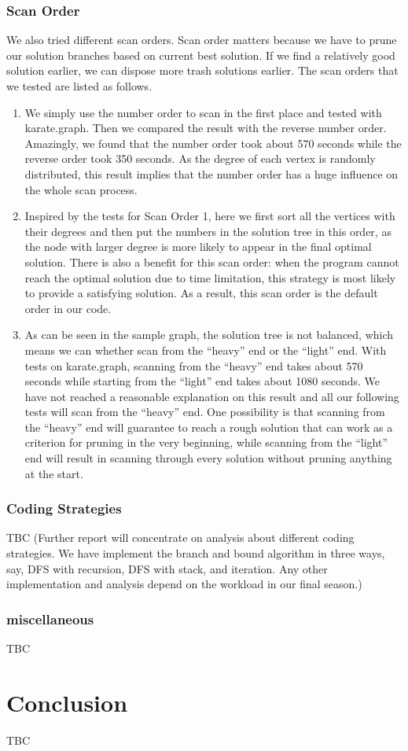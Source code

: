 \subsubsection{Scan Order}
We also tried different scan orders. Scan order matters because we have to prune our solution branches based on current best solution. If we find a relatively good solution earlier, we can dispose more trash solutions earlier. The scan orders that we tested are listed as follows.
\begin{enumerate}
\item We simply use the number order to scan in the first place and tested with karate.graph. Then we compared the result with the reverse number order. Amazingly, we found that the number order took about 570 seconds while the reverse order took 350 seconds. As the degree of each vertex is randomly distributed, this result implies that the number order has a huge influence on the whole scan process.
\item Inspired by the tests for Scan Order 1, here we first sort all the vertices with their degrees and then put the numbers in the solution tree in this order, as the node with larger degree is more likely to appear in the final optimal solution. There is also a benefit for this scan order: when the program cannot reach the optimal solution due to time limitation, this strategy is most likely to provide a satisfying solution. As a result, this scan order is the default order in our code.
\item As can be seen in the sample graph, the solution tree is not balanced, which means we can whether scan from the ``heavy'' end or the ``light'' end. With tests on karate.graph, scanning from the ``heavy'' end takes about 570 seconds while starting from the ``light'' end takes about 1080 seconds. We have not reached a reasonable explanation on this result and all our following tests will scan from the ``heavy'' end. One possibility is that scanning from the ``heavy'' end will guarantee to reach a rough solution that can work as a criterion for pruning in the very beginning, while scanning from the ``light'' end will result in scanning through every solution without pruning anything at the start.
\end{enumerate}
\subsubsection{Coding Strategies}
TBC (Further report will concentrate on analysis about different coding strategies. We have implement the branch and bound algorithm in three ways, say, DFS with recursion, DFS with stack, and iteration. Any other implementation and analysis depend on the workload in our final season.)
\subsubsection{miscellaneous}
TBC

\section{Conclusion}
TBC

\nocite{*}


